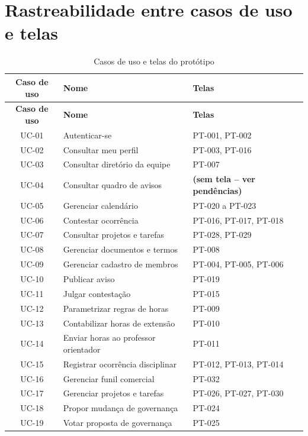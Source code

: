 \section{Rastreabilidade entre casos de uso e telas}

\begin{center}
\footnotesize
\begin{longtable}{|c|p{5.2cm}|p{5.6cm}|}
\caption{Casos de uso e telas do protótipo}\label{tab:rastreabilidade}\\
\hline
\textbf{Caso de uso} & \textbf{Nome} & \textbf{Telas} \\
\hline
\endfirsthead
\hline
\textbf{Caso de uso} & \textbf{Nome} & \textbf{Telas} \\
\hline
\endhead
UC-01 & Autenticar-se & PT-001, PT-002 \\ \hline
UC-02 & Consultar meu perfil & PT-003, PT-016 \\ \hline
UC-03 & Consultar diretório da equipe & PT-007 \\ \hline
UC-04 & Consultar quadro de avisos & \textbf{(sem tela -- ver pendências)} \\ \hline
UC-05 & Gerenciar calendário & PT-020 a PT-023 \\ \hline
UC-06 & Contestar ocorrência & PT-016, PT-017, PT-018 \\ \hline
UC-07 & Consultar projetos e tarefas & PT-028, PT-029 \\ \hline
UC-08 & Gerenciar documentos e termos & PT-008 \\ \hline
UC-09 & Gerenciar cadastro de membros & PT-004, PT-005, PT-006 \\ \hline
UC-10 & Publicar aviso & PT-019 \\ \hline
UC-11 & Julgar contestação & PT-015 \\ \hline
UC-12 & Parametrizar regras de horas & PT-009 \\ \hline
UC-13 & Contabilizar horas de extensão & PT-010 \\ \hline
UC-14 & Enviar horas ao professor orientador & PT-011 \\ \hline
UC-15 & Registrar ocorrência disciplinar & PT-012, PT-013, PT-014 \\ \hline
UC-16 & Gerenciar funil comercial & PT-032 \\ \hline
UC-17 & Gerenciar projetos e tarefas & PT-026, PT-027, PT-030 \\ \hline
UC-18 & Propor mudança de governança & PT-024 \\ \hline
UC-19 & Votar proposta de governança & PT-025 \\ \hline

\end{longtable}
\end{center}

